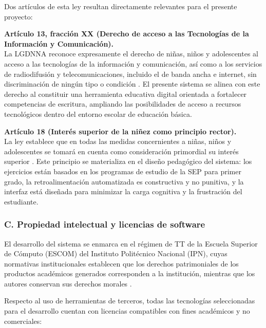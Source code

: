 Dos artículos de esta ley resultan directamente relevantes para el presente proyecto:

\textbf{Artículo 13, fracción XX (Derecho de acceso a las Tecnologías de la Información y Comunicación).} \\
La LGDNNA reconoce expresamente el derecho de niñas, niños y adolescentes al acceso a las tecnologías de la información y comunicación, así como a los servicios de radiodifusión y telecomunicaciones, incluido el de banda ancha e internet, sin discriminación de ningún tipo o condición \cite{lgdnna2024}. El presente sistema se alinea con este derecho al constituir una herramienta educativa digital orientada a fortalecer competencias de escritura, ampliando las posibilidades de acceso a recursos tecnológicos dentro del entorno escolar de educación básica.

\textbf{Artículo 18 (Interés superior de la niñez como principio rector).} \\
La ley establece que en todas las medidas concernientes a niñas, niños y adolescentes se tomará en cuenta como consideración primordial su interés superior \cite{lgdnna2024}. Este principio se materializa en el diseño pedagógico del sistema: los ejercicios están basados en los programas de estudio de la SEP para primer grado, la retroalimentación automatizada es constructiva y no punitiva, y la interfaz está diseñada para minimizar la carga cognitiva y la frustración del estudiante.

\subsubsection*{C. Propiedad intelectual y licencias de software}
El desarrollo del sistema se enmarca en el régimen de TT de la Escuela Superior de Cómputo (ESCOM) del Instituto Politécnico Nacional (IPN), cuyas normativas institucionales establecen que los derechos patrimoniales de los productos académicos generados corresponden a la institución, mientras que los autores conservan sus derechos morales \cite{escom_tt}.

Respecto al uso de herramientas de terceros, todas las tecnologías seleccionadas para el desarrollo cuentan con licencias compatibles con fines académicos y no comerciales:

